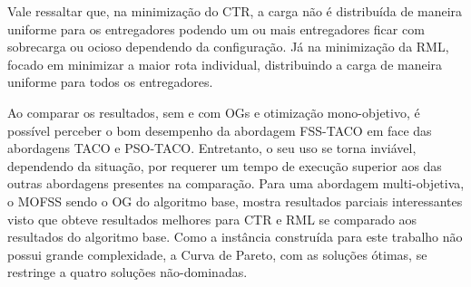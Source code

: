 Vale ressaltar que, na minimização do CTR, a carga não é distribuída de maneira uniforme para os entregadores podendo um ou mais entregadores ficar com sobrecarga ou ocioso dependendo da configuração. Já na minimização da RML, focado em minimizar a maior rota individual, distribuindo a carga de maneira uniforme para todos os entregadores.

Ao comparar os resultados, sem e com OGs e otimização mono-objetivo, é possível perceber o bom desempenho da abordagem FSS-TACO em face das abordagens TACO e PSO-TACO. Entretanto, o seu uso se torna inviável, dependendo da situação, por requerer um tempo de execução superior aos das outras abordagens presentes na comparação. Para uma abordagem multi-objetiva, o MOFSS sendo o OG do algoritmo base, mostra resultados parciais interessantes visto que obteve resultados melhores para CTR e RML se comparado aos resultados do algoritmo base. Como a instância construída para este trabalho não possui grande complexidade, a Curva de Pareto, com as soluções ótimas, se restringe a quatro soluções não-dominadas.